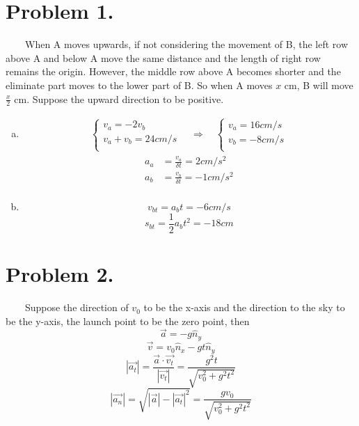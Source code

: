 \documentclass{article}
\begin{document}
\section*{Problem 1.}
	$\quad \quad$When A moves upwards, if not considering the movement of B, the left row above A and below A move the same distance and the length of right row remains the origin. However, the middle row above A becomes shorter and the eliminate part moves to the lower part of B. So when A moves $x$ cm, B will move $\frac{x}{2}$ cm. Suppose the upward direction to be positive.
	\begin{enumerate}[(a)]
	\item
		\begin{eqnarray*}
			\left\{
			\begin{array}{lll}
				v_a=-2v_b\\
				v_a+v_b=24cm/s\\
			\end{array}
			\right.\quad\Rightarrow\quad
			\left\{
			\begin{array}{lll}
				v_a=16cm/s\\
				v_b=-8cm/s\\
			\end{array}
			\right.
		\end{eqnarray*}
		\begin{align*}
		a_a&=\frac{v_a}{\delta t}=2cm/s^2\\
		a_b&=\frac{v_b}{\delta t}=-1cm/s^2\\
		\end{align*}
	\item
		$$v_{bt}=a_bt=-6cm/s$$
		$$s_{bt}=\frac{1}{2}a_bt^2=-18cm$$
	\end{enumerate}
	
\section*{Problem 2.}
	$\quad \quad$Suppose the direction of $v_0$ to be the x-axis and the direction to the sky to be the y-axis, the launch point to be the zero point, then
	$$\vec{a}=-g\hat{n}_y$$
	$$\vec{v}=v_0\hat{n}_x-gt\hat{n}_y$$
	$$|\vec{a_t}|=\frac{\vec{a}\cdot\vec{v_t}}{|\vec{v_t}|}=\frac{g^2t}{\sqrt{v_0^2+g^2t^2}}$$
	$$|\vec{a_n}|=\sqrt{|\vec{a}|-|\vec{a_t}|^2}=\frac{gv_0}{\sqrt{v_0^2+g^2t^2}}$$
\end{document}

